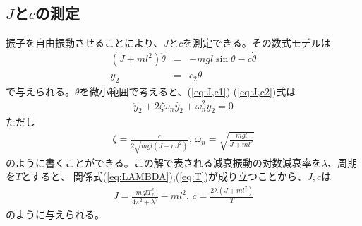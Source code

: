 \documentclass[a4j,11pt,twoside]{ujbook}
\begin{document}
\subsection{$J$と$c$の測定}
振子を自由振動させることにより、$J$と$c$を測定できる。その数式モデルは
\begin{eqnarray}
(J+ml^2)\ddot{\theta} & = & -mgl\sin{\theta} - c\dot{\theta}
\label{eq:J,c1}\\
y_2 & = & c_2\theta
\label{eq:J,c2}
\end{eqnarray}
で与えられる。$\theta$を微小範囲で考えると、(\ref{eq:J,c1})-(\ref{eq:J,c2})式は
\begin{eqnarray}
	\ddot{y}_2 + 2\zeta\omega_n\dot{y_2} + \omega_n^2y_2 = 0
\end{eqnarray}
ただし
\begin{eqnarray}
	\zeta = \frac{c}{2\sqrt{mgl(J + ml^2)}},\,
	\omega_n = \sqrt{\frac{mgl}{J + ml^2}}
\end{eqnarray}
のように書くことができる。この解で表される減衰振動の対数減衰率を$\lambda$、周期を$T$とすると、
関係式(\ref{eq:LAMBDA}),(\ref{eq:T})が成り立つことから、$J,c$は
\begin{eqnarray}
J = \frac{mglT_2^2}{4\pi^2 + \lambda^2} - ml^2 ,\, c = \frac{2\lambda(J +
	ml^2)}{T}
\end{eqnarray}
のように与えられる。

\clearpage
\end{document}
